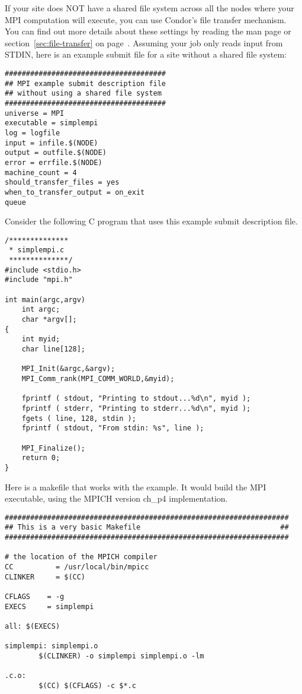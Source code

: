 If your site does NOT have a shared file system across all the nodes
where your MPI computation will execute, you can use Condor's file
transfer mechanism.
You can find out more details about these settings by reading the
 man page or section~\ref{sec:file-transfer} on
page~\pageref{sec:file-transfer}. 
Assuming your job only reads input from STDIN, here is an example
submit file for a site without a shared file system:

\begin{verbatim}
######################################
## MPI example submit description file
## without using a shared file system
######################################
universe = MPI
executable = simplempi
log = logfile
input = infile.$(NODE)
output = outfile.$(NODE)
error = errfile.$(NODE)
machine_count = 4
should_transfer_files = yes
when_to_transfer_output = on_exit
queue
\end{verbatim}

Consider the following C program that uses this example submit
description file.

\begin{verbatim}
/**************
 * simplempi.c
 **************/
#include <stdio.h>
#include "mpi.h"

int main(argc,argv)
    int argc;
    char *argv[];
{
    int myid;
    char line[128];

    MPI_Init(&argc,&argv);
    MPI_Comm_rank(MPI_COMM_WORLD,&myid);

    fprintf ( stdout, "Printing to stdout...%d\n", myid );
    fprintf ( stderr, "Printing to stderr...%d\n", myid );
    fgets ( line, 128, stdin );
    fprintf ( stdout, "From stdin: %s", line );

    MPI_Finalize();
    return 0;
}
\end{verbatim}

Here is a makefile that works with the example.
It would build the MPI executable, using the MPICH
version ch\_p4 implementation.
\begin{verbatim}
###################################################################
## This is a very basic Makefile                                 ##
###################################################################

# the location of the MPICH compiler
CC          = /usr/local/bin/mpicc
CLINKER     = $(CC)

CFLAGS    = -g
EXECS     = simplempi

all: $(EXECS)

simplempi: simplempi.o
        $(CLINKER) -o simplempi simplempi.o -lm

.c.o:
        $(CC) $(CFLAGS) -c $*.c
\end{verbatim}

